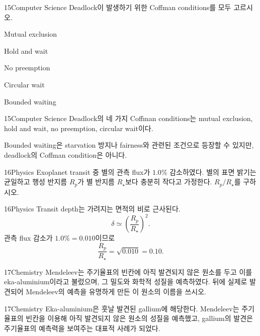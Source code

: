 \documentclass[12pt,aspectratio=169]{beamer}
\begin{document}
\begin{problemframe}{15}{Computer Science}
Deadlock이 발생하기 위한 Coffman conditions를 모두 고르시오.
\begin{simchoices}
  \item Mutual exclusion
  \item Hold and wait
  \item No preemption
  \item Circular wait
  \item Bounded waiting
\end{simchoices}
\end{problemframe}

\begin{solutionframe}{15}{Computer Science}
Deadlock의 네 가지 Coffman conditions는 mutual exclusion, hold and wait, no preemption, circular wait이다.

Bounded waiting은 starvation 방지나 fairness와 관련된 조건으로 등장할 수 있지만, deadlock의 Coffman condition은 아니다.
\end{solutionframe}

\begin{problemframe}{16}{Physics}
Exoplanet transit 중 별의 관측 flux가 $1.0\%$ 감소하였다. 별의 표면 밝기는 균일하고 행성 반지름 $R_p$가 별 반지름 $R_\star$보다 충분히 작다고 가정한다. $R_p/R_\star$를 구하시오.
\end{problemframe}

\begin{solutionframe}{16}{Physics}
Transit depth는 가려지는 면적의 비로 근사된다.
\[
\delta\simeq\left(\frac{R_p}{R_\star}\right)^2.
\]
관측 flux 감소가 $1.0\%=0.010$이므로
\[
\frac{R_p}{R_\star}=\sqrt{0.010}=0.10.
\]
\end{solutionframe}

\begin{problemframe}{17}{Chemistry}
Mendeleev는 주기율표의 빈칸에 아직 발견되지 않은 원소를 두고 이를 eka-aluminium이라고 불렀으며, 그 밀도와 화학적 성질을 예측하였다. 뒤에 실제로 발견되어 Mendeleev의 예측을 유명하게 만든 이 원소의 이름을 쓰시오.
\end{problemframe}

\begin{solutionframe}{17}{Chemistry}
Eka-aluminium은 훗날 발견된 gallium에 해당한다. Mendeleev는 주기율표의 빈칸을 이용해 아직 발견되지 않은 원소의 성질을 예측했고, gallium의 발견은 주기율표의 예측력을 보여주는 대표적 사례가 되었다.
\end{solutionframe}
\end{document}
